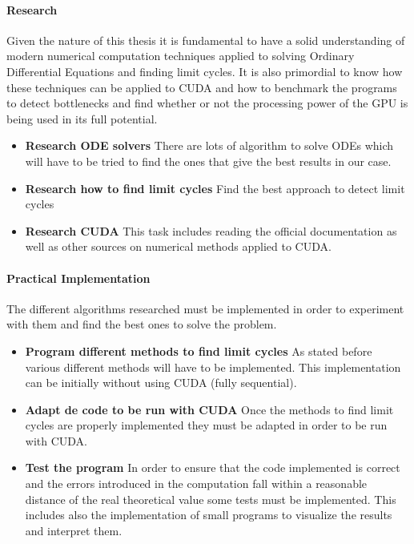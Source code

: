 \paragraph{Research}

Given the nature of this thesis it is fundamental to have a solid understanding
of modern numerical computation techniques applied to solving Ordinary
Differential Equations and finding limit cycles. It is also primordial to know
how these techniques can be applied to CUDA and how to benchmark the programs to
detect bottlenecks and find whether or not the processing power of the GPU is
being used in its full potential.

\begin{itemize}
    \item \textbf{Research ODE solvers} There are lots of algorithm to solve
        ODEs which will have to be tried to find the ones that give the best
        results in our case.
    \item \textbf{Research how to find limit cycles} Find the best approach to
        detect limit cycles
    \item \textbf{Research CUDA} This task includes reading the official
        documentation as well as other sources on numerical methods applied to
        CUDA.
\end{itemize}

\paragraph{Practical Implementation}

The different algorithms researched must be implemented in order to experiment
with them and find the best ones to solve the problem.

\begin{itemize}
    \item \textbf{Program different methods to find limit cycles} As stated
        before various different methods will have to be implemented. This
        implementation can be initially without using CUDA (fully sequential).
    \item \textbf{Adapt de code to be run with CUDA} Once the methods to find
        limit cycles are properly implemented they must be adapted in order to
        be run with CUDA.
    \item \textbf{Test the program} In order to ensure that the code implemented
        is correct and the errors introduced in the computation fall within a
        reasonable distance of the real theoretical value some tests must be
        implemented. This includes also the implementation of small programs to
        visualize the results and interpret them.
\end{itemize}

